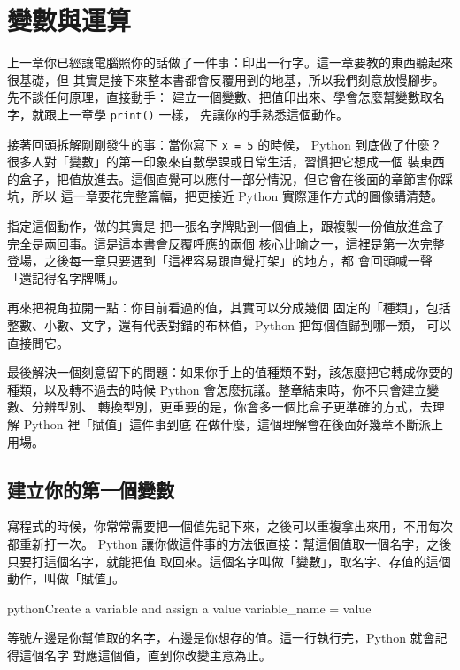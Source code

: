 \chapter{變數與運算}
\label{ch:variables}

上一章你已經讓電腦照你的話做了一件事：印出一行字。這一章要教的東西聽起來很基礎，但
其實是接下來整本書都會反覆用到的地基，所以我們刻意放慢腳步。先不談任何原理，直接動手：
建立一個變數、把值印出來、學會怎麼幫變數取名字，就跟上一章學 \texttt{print()} 一樣，
先讓你的手熟悉這個動作。

接著回頭拆解剛剛發生的事：當你寫下 \texttt{x = 5} 的時候，
Python 到底做了什麼？很多人對「變數」的第一印象來自數學課或日常生活，習慣把它想成一個
裝東西的盒子，把值放進去。這個直覺可以應付一部分情況，但它會在後面的章節害你踩坑，所以
這一章要花完整篇幅，把更接近 Python 實際運作方式的圖像講清楚。

指定這個動作，做的其實是
把一張名字牌貼到一個值上，跟複製一份值放進盒子完全是兩回事。這是這本書會反覆呼應的兩個
核心比喻之一，這裡是第一次完整登場，之後每一章只要遇到「這裡容易跟直覺打架」的地方，都
會回頭喊一聲「還記得名字牌嗎」。

再來把視角拉開一點：你目前看過的值，其實可以分成幾個
固定的「種類」，包括整數、小數、文字，還有代表對錯的布林值，Python 把每個值歸到哪一類，
可以直接問它。

最後解決一個刻意留下的問題：如果你手上的值種類不對，該怎麼把它轉成你要的
種類，以及轉不過去的時候 Python 會怎麼抗議。整章結束時，你不只會建立變數、分辨型別、
轉換型別，更重要的是，你會多一個比盒子更準確的方式，去理解 Python 裡「賦值」這件事到底
在做什麼，這個理解會在後面好幾章不斷派上用場。

\section{建立你的第一個變數}
\label{sec:first-variable}

寫程式的時候，你常常需要把一個值先記下來，之後可以重複拿出來用，不用每次都重新打一次。
Python 讓你做這件事的方法很直接：幫這個值取一個名字，之後只要打這個名字，就能把值
取回來。這個名字叫做「變數」，取名字、存值的這個動作，叫做「賦值」。

\begin{code}{python}{Create a variable and assign a value}
variable_name = value
\end{code}

等號左邊是你幫值取的名字，右邊是你想存的值。這一行執行完，Python 就會記得這個名字
對應這個值，直到你改變主意為止。

